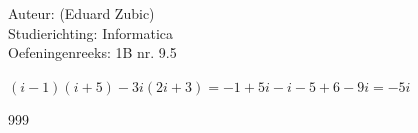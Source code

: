 \documentclass[a4paper]{article}
\begin{document}
  
\noindent \large Auteur: (Eduard Zubic) \\
\noindent \large Studierichting: Informatica\\
\noindent \large Oefeningenreeks: 1B nr. 9.5\\

\medskip

\normalsize

$(i - 1)(i + 5) - 3i(2i + 3) = -1 + 5i - i - 5 + 6 - 9i = -5i$


\begin{thebibliography}{999}
\end{thebibliography}
\end{document}
